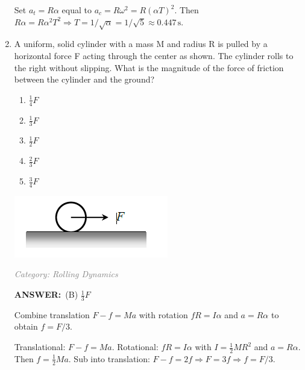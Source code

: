 ﻿\documentclass[12pt, a4paper]{article}
\makeatletter
\newcommand{\finalanswer}[1]{\textbf{ANSWER:}~#1}
\newif\if@categoryprinted
\newcommand{\category}[1]{\if@categoryprinted\relax\else\textit{\textcolor{gray}{Category: #1}}\global\@categoryprintedtrue\fi}
\newcommand{\tags}[1]{}
\makeatother
\begin{document}
\begin{CJK*}{UTF8}{gbsn}
\begin{enumerate}[itemsep=1.0em, topsep=0.6em]
\begin{solutionbox}
Set $a_t=R\alpha$ equal to $a_c=R\omega^2=R(\alpha T)^2$. Then $R\alpha=R\alpha^2 T^2\Rightarrow T=1/\sqrt{\alpha}=1/\sqrt{5}\approx0.447\,\text{s}$.
\end{solutionbox}

\item \label{prob:16}
\noindent\begin{minipage}[t]{0.6\linewidth}
\vspace{0pt}
A uniform, solid cylinder with a mass M and radius R is pulled by a horizontal force F acting through the center as shown. The cylinder rolls to the right without slipping. What is the magnitude of the force of friction between the cylinder and the ground?
\begin{enumerate}[label=(\Alph*)]
    \item $\frac{1}{4}F$
    \item $\frac{1}{3}F$
    \item $\frac{1}{2}F$
    \item $\frac{2}{3}F$
    \item $\frac{3}{4}F$
\end{enumerate}
\end{minipage}%
\hfill
\begin{minipage}[t]{0.35\linewidth}
\vspace{0pt}
\centering
\includegraphics[width=\linewidth]{Problem_16_Figure.png}
\end{minipage}

\category{Rolling Dynamics} \tags{}
\begin{answerbox}
\finalanswer{(B) $\tfrac{1}{3}F$}
\end{answerbox}
\begin{insightbox}
Combine translation $F-f=Ma$ with rotation $fR=I\alpha$ and $a=R\alpha$ to obtain $f=F/3$.
\end{insightbox}
\begin{solutionbox}

Translational: $F-f=Ma$. Rotational: $fR=I\alpha$ with $I=\tfrac{1}{2}MR^2$ and $a=R\alpha$. Then $f=\tfrac{1}{2}Ma$. Sub into translation: $F-f=2f\Rightarrow F=3f\Rightarrow f=F/3$.
\end{solutionbox}


\end{enumerate}
\end{CJK*}
\end{document}
